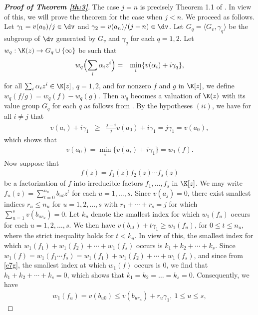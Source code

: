 \documentclass[12pt]{amsart}%
\begin{document}
\begin{proof}[\bf Proof of Theorem \ref{th:3}]
The case $j=n$ is precisely Theorem 1.1 of \cite{AJ}. In view of this, we will prove the theorem for the case when $j<n$. We proceed as follows. Let $\gamma_1= v(a_0)/j\in \dv$ and $\gamma_2= v(a_n)/(j-n)\in \dv$. Let $G_q=\langle G_v,\gamma_q\rangle$ be the subgroup of $\dv$ generated by $G_v$ and $\gamma_q$ for each $q=1,2$. Let $w_q:\K(z)\rightarrow G_q\cup\{\infty\}$ be such that
\begin{eqnarray*}
w_q\Bigl(\sum_{i}\alpha_i z^i\Bigr) &=& \min_i\{v(\alpha_i)+i\gamma_q\},
\end{eqnarray*}
for all $\sum_{i}\alpha_i z^i\in \K[z]$, $q=1,2$, and for nonzero $f$ and $g$ in $\K[z]$, we define $w_q(f/g)=w_q(f)-w_q(g)$. Then $w_q$ becomes a valuation of $\K(z)$ with its value group $G_q$ for each $q$ as follows from \cite[Theorem 2.2]{EP}. By the hypotheses $(ii)$, we have for all $i\neq j$ that
\begin{eqnarray*}
v(a_i)+i\gamma_1&\geq & \frac{j-i}{j}v(a_0)+i\gamma_1=j\gamma_1 =v(a_0),
\end{eqnarray*}
which shows that
\begin{eqnarray}\label{e7g}
v(a_0)=\min_i\{v(a_i)+i\gamma_1\}=w_1(f).
\end{eqnarray}
Now suppose that
\begin{eqnarray*}
f(z)=f_1(z)f_2(z)\cdots f_s(z)
\end{eqnarray*}
be a factorization of $f$ into irreducible factors $f_1,\ldots, f_s$ in $\K[z]$. We may write $f_u(z)=\sum_{t=0}^{n_u}b_{ut}z^t$ for each $u=1,\ldots,s$. Since $v(a_j)=0$, there exist smallest indices $r_u\leq n_u$ for $u=1,2,\ldots, s$ with $r_1+\cdots +r_s=j$ for which $\sum_{u=1}^sv(b_{ur_u})=0$. Let $k_u$ denote the smallest index for which $w_1(f_u)$ occurs for each $u=1,2,\ldots, s$. We then have
$v(b_{ut})+t\gamma_1\geq w_1(f_u)$,
for $0\leq t \leq n_u$, where the  strict inequality holds for $t<k_u$. In view of this, the smallest index for which $w_1(f_1)+w_1(f_2)+\cdots +w_1(f_s)$ occurs is $k_1+k_2+\cdots +k_s$. Since $w_1(f)=w_1(f_1\cdots f_s)=w_1(f_1)+w_1(f_2)+\cdots +w_1(f_s)$, and since from \eqref{e7g}, the smallest index at which $w_1(f)$ occurs is $0$, we find that $k_1+k_2+\cdots +k_s=0$, which shows that $k_1=k_2=\ldots=k_s=0$. Consequently, we have
\begin{eqnarray}\label{e7h}
w_1(f_u)=v(b_{u0})\leq v(b_{ur_u})+r_u\gamma_1,~1\leq u\leq s,

\end{eqnarray}
\end{proof}
\end{document}

